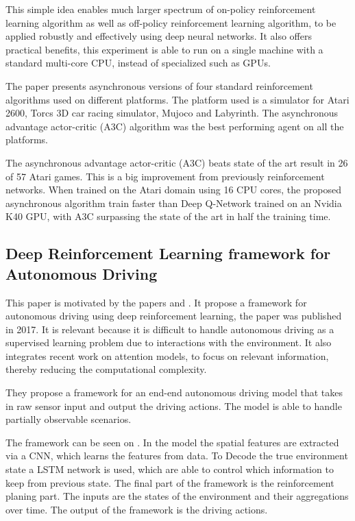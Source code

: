 This simple idea enables much larger spectrum of on-policy reinforcement learning algorithm as well as off-policy reinforcement learning algorithm, to be applied robustly and effectively using deep neural networks.  It also offers practical benefits, this experiment is able to run on a single machine with a standard multi-core CPU, instead of specialized such as GPUs.

The paper presents asynchronous versions of four standard reinforcement algorithms used on different platforms. The platform used is a simulator for Atari 2600, Torcs 3D car racing simulator, Mujoco and Labyrinth. The asynchronous advantage actor-critic (A3C) algorithm was the best performing agent on all the platforms.

The asynchronous advantage actor-critic (A3C) beats state of the art result in 26 of 57 Atari games. This is a big improvement from previously reinforcement networks. When trained on the Atari domain using 16 CPU cores, the proposed asynchronous algorithm train faster than Deep Q-Network trained on an Nvidia K40 GPU, with A3C surpassing the state of the art in half the training time.   

\subsection{Deep Reinforcement Learning framework for Autonomous Driving} \cite{Sallab:2017:2470-1173:70}
This paper is motivated by the papers \cite{DBLP:journals/corr/MnihKSGAWR13} and \cite{Silver_2016}. It propose a framework for autonomous driving using deep reinforcement learning, the paper was published in 2017. It is relevant because it is difficult to handle autonomous driving as a supervised learning problem due to interactions with the environment. It also integrates recent work on attention models, to focus on relevant information, thereby reducing the computational complexity.

They propose a framework for an end-end autonomous driving model that takes in raw sensor input and output the driving actions. The model is able to handle partially observable scenarios. 

The framework can be seen on . In the model the spatial features are extracted via a CNN, which learns the features from data. To Decode the true environment state a LSTM network is used, which are able to control which information to keep from previous state. The final part of the framework is the reinforcement planing part. The inputs are the states of the environment and their aggregations over time. The output of the framework is the driving actions. 

